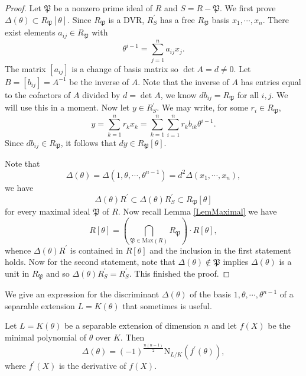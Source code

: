 \begin{proof}
Let $\mathfrak{P}$ be a nonzero prime ideal of $R$ and $S=R-\mathfrak{P}$. We first prove $\Delta(\theta)\subset R_\mathfrak{P}[\theta]$. Since $R_\mathfrak{P}$ is a DVR, $R_S^\prime$ has a free $R_\mathfrak{P}$ basis $x_1,\cdots,x_n$. There exist elements $a_{ij}\in R_\mathfrak{P}$ with 
$$
\theta ^{i-1}=\sum_{j=1}^n{a_{ij}x_j}.
$$
The matrix $[a_{ij}]$ is a change of basis matrix so $\det A=d\ne 0$. Let $B=[b_{ij}]=A^{-1}$ be the inverse of $A$. Note that the inverse of $A$ has entries equal to the cofactors of $A$ divided by $d=\det A$, we know $db_{ij}=R_\mathfrak{P}$ for all $i,j$. We will use this in a moment. Now let $y\in R_S^\prime$. We may write, for some $r_i\in R_\mathfrak{P}$, 
$$
y=\sum_{k=1}^n{r_kx_k}=\sum_{k=1}^n{\sum_{i=1}^n{r_kb_{ik}\theta ^{i-1}}}.
$$
Since $db_{ij}\in R_\mathfrak{P}$, it follows that $dy\in R_\mathfrak{P}[\theta]$.\par
Note that 
$$
\Delta \left( \theta \right) =\Delta \left( 1,\theta ,\cdots ,\theta ^{n-1} \right) =d^2\Delta \left( x_1,\cdots ,x_n \right) ,
$$
we have 
$$
\Delta \left( \theta \right) R^{\prime}\subset \Delta \left( \theta \right) R_{S}^{\prime}\subset R_{\mathfrak{P}}\left[ \theta \right] 
$$
for every maximal ideal $\mathfrak{P}$ of $R$. Now recall Lemma \ref{LemMaximal} we have 
$$
R\left[ \theta \right] =\left( \bigcap_{\mathfrak{P} \in \mathrm{Max}\left( R \right)}{R_{\mathfrak{P}}} \right) \cdot R\left[ \theta \right] ,
$$
whence $\Delta(\theta)R^\prime$ is contained in $R[\theta]$ and the inclusion in the first statement holds. Now for the second statement, note that $\Delta(\theta)\notin\mathfrak{P}$ implies $\Delta(\theta)$ is a unit in $R_\mathfrak{P}$ and so $\Delta(\theta)R_S^\prime=R_S^\prime$. This finished the proof.
\end{proof}
We give an expression for the discriminant $\Delta(\theta)$ of the basis $1,\theta,\cdots,\theta^{n-1}$ of a separable extension $L=K(\theta)$ that sometimes is useful.
\begin{theorem}
Let $L=K(\theta)$ be a separable extension of dimension $n$ and let $f(X)$ be the minimal polynomial of $\theta$ over $K$. Then 
$$
\Delta \left( \theta \right) =\left( -1 \right) ^{\frac{n\left( n-1 \right)}{2}}\mathrm{N}_{L/K}\left( f^{\prime}\left( \theta \right) \right) ,
$$
where $f^\prime(X)$ is the derivative of $f(X)$.
\end{theorem}

